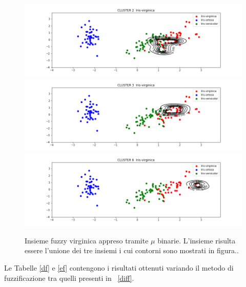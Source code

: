 \documentclass [11pt,a4paper,twoside,openright] {book}
\begin{document}
\begin{figure}[!tb]
        \centering%
        \subfigure%
          {\includegraphics[scale=.3, angle=90]{figure/blvirg1.png}}\qquad\qquad
       \subfigure%
          {\includegraphics[scale=.3, angle=90]{figure/blvirg2.png}}\qquad\qquad
           \subfigure%
          {\includegraphics[scale=.3, angle=90]{figure/blvirg3.png}}
          \caption{Insieme fuzzy virginica appreso tramite $\mu$ binarie. L'insieme risulta essere l'unione dei tre insiemi i cui contorni sono mostrati in figura.\label{blvirg}.}
\end{figure}Le Tabelle \ref{df} e \ref{ef} contengono i risultati ottenuti variando il metodo di fuzzificazione tra quelli presenti in \figurename~\ref{diff}.
\end{document}
